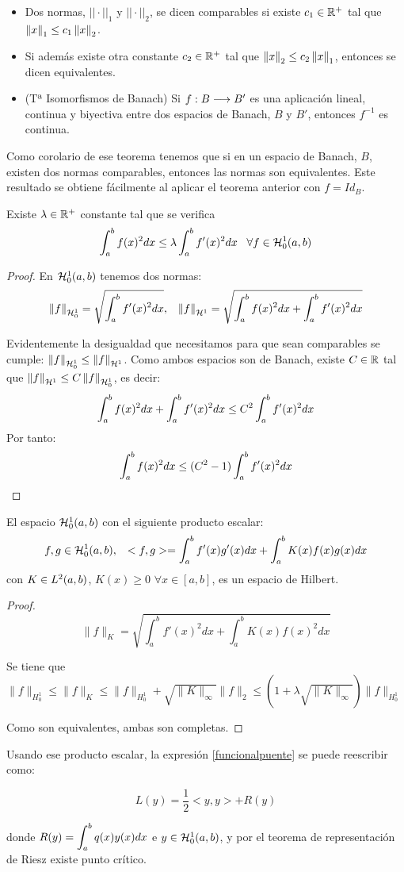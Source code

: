 \begin{remark}
\begin{itemize}
\label{notafuncional}
\item Dos normas, $||\cdot||_1$ y $||\cdot||_2$, se dicen comparables si existe $c_1\in\R^+$ tal que $\norm{x}_1\leq c_1\norm{x}_2$.
\item Si además existe otra constante $c_2\in\R^+$ tal que $\norm{x}_2\leq c_2\norm{x}_1$, entonces se dicen equivalentes.
\item (Tª Isomorfismos de Banach) Si $\funcion{f}{B}{B'}$ es una aplicación lineal, continua y biyectiva entre dos espacios de Banach, $B$ y $B'$, entonces $f^{-1}$ es continua.
\end{itemize}

Como corolario de ese teorema tenemos que si en un espacio de Banach, $B$, existen dos normas comparables, entonces las normas son equivalentes. Este resultado se obtiene fácilmente al aplicar el teorema anterior con $f=Id_B$.
\end{remark}

\begin{prop}
\label{lemapoincare}
Existe $\lambda\in\R^+$ constante tal que se verifica
\[
\integral{a}{b}{f(x)^2dx}\leq\lambda\integral{a}{b}{f'(x)^2dx} \espacio \forall f\in\sobolevcero{1}
\]
\end{prop}

\begin{proof}

En $\sobolevcero{1}$ tenemos dos normas:
\[
\normasobolevcero{1}{f} = \sqrt{\integral{a}{b}{f'(x)^2dx}}, \espacio \normasobolev{1}{f}=\sqrt{\integral{a}{b}{f(x)^2dx}+\integral{a}{b}{f'(x)^2dx}}
\]

Evidentemente la desigualdad que necesitamos para que sean comparables se cumple: $\normasobolevcero{1}{f}\leq \normasobolev{1}{f}$. Como ambos espacios son de Banach, existe $C\in\R$ tal que $\normasobolev{1}{f}\leq C\normasobolevcero{1}{f}$, es decir:
\[
\integral{a}{b}{f(x)^2dx}+\integral{a}{b}{f'(x)^2dx}\leq C^2\integral{a}{b}{f'(x)^2dx}
\]
Por tanto:
\[
\integral{a}{b}{f(x)^2dx}\leq (C^2-1)\integral{a}{b}{f'(x)^2dx}
\]

\end{proof}

\begin{prop}
El espacio $\sobolevcero[a,b]{1}$ con el siguiente producto escalar:
\[
f,g\in\sobolevcero[a,b]{1}, \espacio <f,g>=\integral{a}{b}{f'(x)g'(x)dx}+\integral{a}{b}{K(x)f(x)g(x)dx}
\]
con $K\in\lebesgue{2}$, $K(x)\geq 0$ $\forall x\in[a,b]$, es un espacio de Hilbert.
\end{prop}
\begin{proof}
\[\|f\|_K=\sqrt{\int_a^b f'(x)^2 dx+\int_a^b K(x)f(x)^2dx}\]

Se tiene que $\|f\|_{H_0^1}\leq \|f\|_K \leq \|f\|_{H_0^1}+\sqrt{\|K\|_\infty}\|f\|_2 \leq (1+\lambda\sqrt{\|K\|_\infty})\|f\|_{H_0^1}$

Como son equivalentes, ambas son completas.
\end{proof}

Usando ese producto escalar, la expresión \eqref{funcionalpuente} se puede reescribir como:

\[
L(y)=\frac{1}{2}<y,y>+R(y)
\]

donde $R(y)=\integral{a}{b}{q(x)y(x)dx}$ e $y\in\sobolevcero{1}$, y por el teorema de representación de Riesz existe punto crítico.
